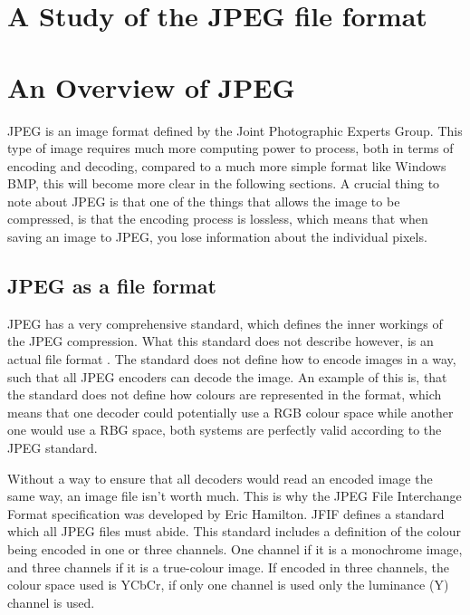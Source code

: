 
\begin{infobox}{\section[A Study of the JPEG file format]{A Study of the JPEG file format}}

\section*{An Overview of JPEG}
JPEG is an image format defined by the Joint Photographic Experts Group. 
This type of image requires much more computing power to process, both in terms of encoding and decoding, compared to a much more simple format like Windows BMP, this will become more clear in the following sections. 
A crucial thing to note about JPEG is that one of the things that allows the image to be compressed, is that the encoding process is lossless, which means that when saving an image to JPEG, you lose information about the individual pixels.

\subsection*{JPEG as a file format}

JPEG has a very comprehensive standard, which defines the inner workings of the JPEG compression. 
What this standard does not describe however, is an actual file format \citep{Miano1999}. 
The standard does not define how to encode images in a way, such that all JPEG encoders can decode the image. 
An example of this is, that the standard does not define how colours are represented in the format, which means that one decoder could potentially use a RGB colour space while another one would use a RBG space, both systems are perfectly valid according to the JPEG standard.

Without a way to ensure that all decoders would read an encoded image the same way, an image file isn't worth much. This is why the JPEG File Interchange Format specification \citep{JFIFSpecs} was developed by Eric Hamilton. JFIF defines a standard which all JPEG files must abide. This standard includes a definition of the colour being encoded in one or three channels. One channel if it is a monochrome image, and three channels if it is a true-colour image. If encoded in three channels, the colour space used is YCbCr, if only one channel is used only the luminance (Y) channel is used.


\end{infobox}

